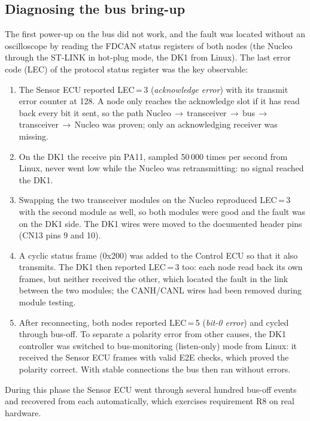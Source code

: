 \subsection{Diagnosing the bus bring-up}

The first power-up on the bus did not work, and the fault was located without an oscilloscope by reading the FDCAN status registers of both nodes (the Nucleo through the ST-LINK in hot-plug mode, the DK1 from Linux). The last error code (LEC) of the protocol status register was the key observable:

\begin{enumerate}[nosep]
  \item The Sensor ECU reported LEC\,=\,3 (\textit{acknowledge error}) with its transmit error counter at 128. A node only reaches the acknowledge slot if it has read back every bit it sent, so the path Nucleo\,$\rightarrow$\,transceiver\,$\rightarrow$\,bus\,$\rightarrow$\,transceiver\,$\rightarrow$\,Nucleo was proven; only an acknowledging receiver was missing.
  \item On the DK1 the receive pin PA11, sampled 50\,000 times per second from Linux, never went low while the Nucleo was retransmitting: no signal reached the DK1.
  \item Swapping the two transceiver modules on the Nucleo reproduced LEC\,=\,3 with the second module as well, so both modules were good and the fault was on the DK1 side. The DK1 wires were moved to the documented header pins (CN13 pins 9 and 10).
  \item A cyclic status frame (0x200) was added to the Control ECU so that it also transmits. The DK1 then reported LEC\,=\,3 too: each node read back its own frames, but neither received the other, which located the fault in the link between the two modules; the CANH/CANL wires had been removed during module testing.
  \item After reconnecting, both nodes reported LEC\,=\,5 (\textit{bit-0 error}) and cycled through bus-off. To separate a polarity error from other causes, the DK1 controller was switched to bus-monitoring (listen-only) mode from Linux: it received the Sensor ECU frames with valid E2E checks, which proved the polarity correct. With stable connections the bus then ran without errors.
\end{enumerate}

During this phase the Sensor ECU went through several hundred bus-off events and recovered from each automatically, which exercises requirement R8 on real hardware.

